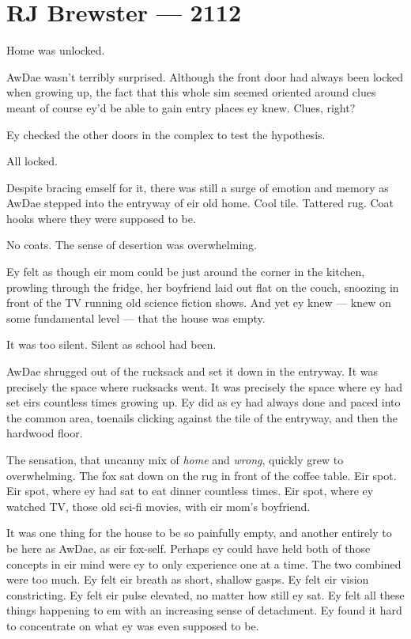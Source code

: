 \hypertarget{rj-brewster-2112}{%
\chapter*{RJ Brewster — 2112}\label{rj-brewster-2112}}

Home was unlocked.

AwDae wasn't terribly surprised. Although the front door had always been locked when growing up, the fact that this whole sim seemed oriented around clues meant of course ey'd be able to gain entry places ey knew. Clues, right?

Ey checked the other doors in the complex to test the hypothesis.

All locked.

Despite bracing emself for it, there was still a surge of emotion and memory as AwDae stepped into the entryway of eir old home. Cool tile. Tattered rug. Coat hooks where they were supposed to be.

No coats. The sense of desertion was overwhelming.

Ey felt as though eir mom could be just around the corner in the kitchen, prowling through the fridge, her boyfriend laid out flat on the couch, snoozing in front of the TV running old science fiction shows. And yet ey knew — knew on some fundamental level — that the house was empty.

It was too silent. Silent as school had been.

AwDae shrugged out of the rucksack and set it down in the entryway. It was precisely the space where rucksacks went. It was precisely the space where ey had set eirs countless times growing up. Ey did as ey had always done and paced into the common area, toenails clicking against the tile of the entryway, and then the hardwood floor.

The sensation, that uncanny mix of \emph{home} and \emph{wrong}, quickly grew to overwhelming. The fox sat down on the rug in front of the coffee table. Eir spot. Eir spot, where ey had sat to eat dinner countless times. Eir spot, where ey watched TV, those old sci-fi movies, with eir mom's boyfriend.

It was one thing for the house to be so painfully empty, and another entirely to be here as AwDae, as eir fox-self. Perhaps ey could have held both of those concepts in eir mind were ey to only experience one at a time. The two combined were too much. Ey felt eir breath as short, shallow gasps. Ey felt eir vision constricting. Ey felt eir pulse elevated, no matter how still ey sat. Ey felt all these things happening to em with an increasing sense of detachment. Ey found it hard to concentrate on what ey was even supposed to be.

